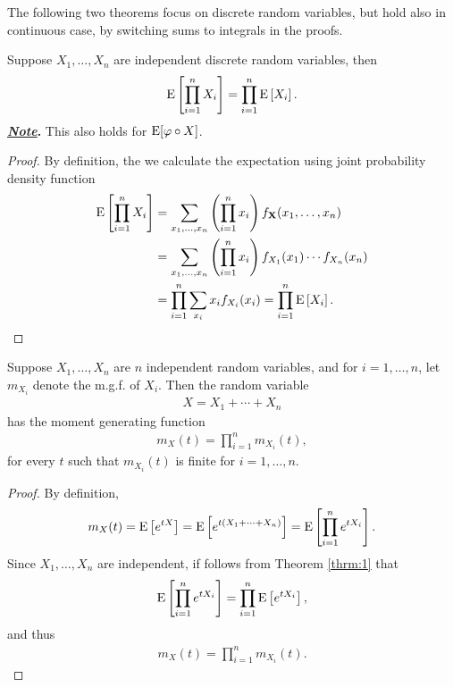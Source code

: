 The following two theorems focus on discrete random variables, but hold also in continuous case, by switching sums to integrals in the proofs.
\begin{theorem}\label{thrm:1}
	Suppose $X_1, \ldots, X_n$ are independent discrete random variables, then
	\begin{align*}
	\mathrm{E}\left[\prod_{i=1}^n X_i \right] = \prod_{i=1}^n \mathrm{E}\left[X_i \right].
	\end{align*}
	\textbf{\underline{\emph{Note}}.} This also holds for $\mathrm{E}[\varphi\circ X]$.
\end{theorem}
\begin{proof}
	By definition, the we calculate the expectation using joint probability density function
	\begin{align*}
	\mathrm{E}\left[\prod_{i=1}^n X_i \right] & = \sum_{x_1, \ldots, x_n} \left(\prod_{i=1}^n x_i \right) f_{\mathbf{X}}(x_1, \ldots, x_n) \\
	& = \sum_{x_1, \ldots, x_n} \left(\prod_{i=1}^n x_i \right) f_{X_1}(x_1)\cdots f_{X_n}(x_n) \\
	& = \prod_{i=1}^n \sum_{x_i} x_i f_{X_i}(x_i) = \prod_{i=1}^n \mathrm{E}\left[X_i \right].
	\end{align*}
\end{proof}
\begin{theorem}
	\label{thrm:3}
	Suppose $X_1, \ldots, X_n$ are $n$ independent random variables, and for $i = 1, \ldots, n$, let $m_{X_i}$ denote the m.g.f. of $X_i$. Then the random variable
	\begin{align*}
	X = X_1 + \cdots + X_n
	\end{align*}
	has the moment generating function
	\begin{align*}
	m_X(t) = \prod_{i=1}^n m_{X_i}(t),
	\end{align*}
	for every $t$ such that $m_{X_i}(t)$ is finite for $i = 1, \ldots, n$.
\end{theorem}
\begin{proof}
	By definition,
	\begin{align*}
	m_X(t) = \mathrm{E}\left[e^{tX} \right] = \mathrm{E}\left[e^{t(X_1 + \cdots + X_n)} \right] = \mathrm{E}\left[\prod_{i=1}^ne^{tX_i} \right].
	\end{align*}
	Since $X_1, \ldots, X_n$ are independent, if follows from Theorem \ref{thrm:1} that 
	\begin{align*}
	\mathrm{E}\left[\prod_{i=1}^ne^{tX_i} \right] = \prod_{i=1}^n \mathrm{E}\left[e^{tX_i} \right],
	\end{align*}
	and thus
	\begin{align*}
	m_X(t) = \prod_{i=1}^n m_{X_i}(t).
	\end{align*}
\end{proof}


